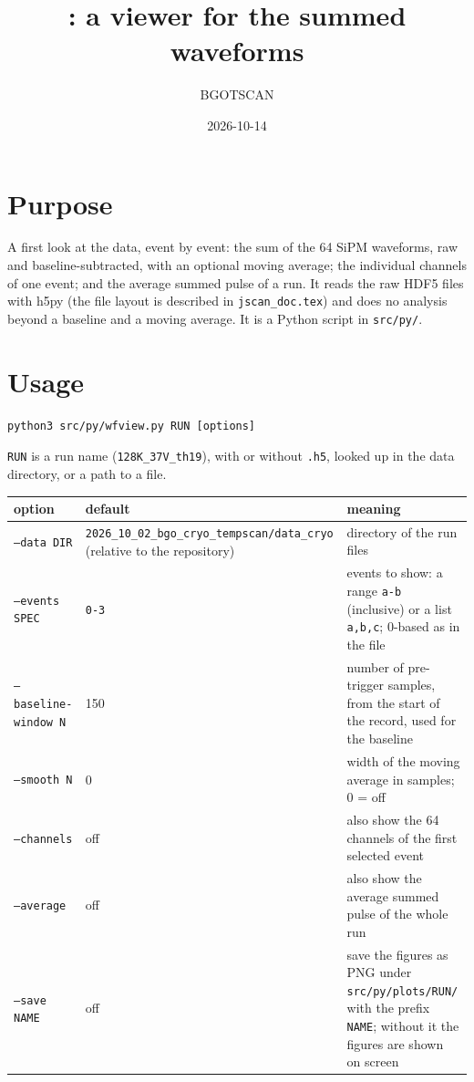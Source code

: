 \documentclass[11pt]{article}
\title{\code{wfview.py}: a viewer for the summed waveforms}
\author{BGOTSCAN}
\date{2026-10-14}
\newcommand{\code}[1]{\texttt{#1}}
\begin{document}
\maketitle

\section{Purpose}

A first look at the data, event by event: the sum of the 64 SiPM waveforms,
raw and baseline-subtracted, with an optional moving average; the individual
channels of one event; and the average summed pulse of a run. It reads the
raw HDF5 files with h5py (the file layout is described in
\code{jscan\_doc.tex}) and does no analysis beyond a baseline and a moving
average. It is a Python script in \code{src/py/}.

\section{Usage}

\begin{lstlisting}
python3 src/py/wfview.py RUN [options]
\end{lstlisting}

\code{RUN} is a run name (\code{128K\_37V\_th19}), with or without
\code{.h5}, looked up in the data directory, or a path to a file.

\begin{center}
\begin{tabular}{l l p{80mm}}
\toprule
option & default & meaning \\
\midrule
\code{--data DIR} & \code{2026\_10\_02\_bgo\_cryo\_tempscan/data\_cryo} (relative to the repository) & directory of the run files \\
\code{--events SPEC} & \code{0-3} & events to show: a range \code{a-b} (inclusive) or a list \code{a,b,c}; 0-based as in the file \\
\code{--baseline-window N} & 150 & number of pre-trigger samples, from the start of the record, used for the baseline \\
\code{--smooth N} & 0 & width of the moving average in samples; 0 = off \\
\code{--channels} & off & also show the 64 channels of the first selected event \\
\code{--average} & off & also show the average summed pulse of the whole run \\
\code{--save NAME} & off & save the figures as PNG under \code{src/py/plots/RUN/} with the prefix \code{NAME}; without it the figures are shown on screen \\
\bottomrule
\end{tabular}
\end{center}
\end{document}
